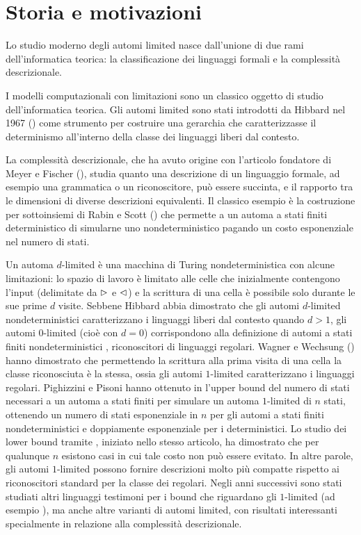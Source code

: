 \preface

\section*{Storia e motivazioni}
Lo studio moderno degli automi limited nasce dall'unione di due rami dell'informatica teorica: la classificazione dei linguaggi formali e la complessità descrizionale.

I modelli computazionali con limitazioni sono un classico oggetto di studio dell'informatica teorica. Gli automi limited sono stati introdotti da Hibbard nel 1967 (\cite{Hibbard:67:CFdet}) come strumento per costruire una gerarchia che caratterizzasse il determinismo all'interno della classe dei linguaggi liberi dal contesto.

La complessità descrizionale, che ha avuto origine con l'articolo fondatore di Meyer e Fischer (\cite{Meyer:71:ecodescription}), studia quanto una descrizione di un linguaggio formale, ad esempio una grammatica o un riconoscitore, può essere succinta, e il rapporto tra le dimensioni di diverse descrizioni equivalenti. Il classico esempio è la costruzione per sottoinsiemi di Rabin e Scott (\cite{Rabin:59:NFA}) che permette a un automa a stati finiti deterministico di simularne uno nondeterministico pagando un costo esponenziale nel numero di stati.

Un automa $d$-limited è una macchina di Turing nondeterministica con alcune limitazioni: lo spazio di lavoro è limitato alle celle che inizialmente contengono l'input (delimitate da $\rhd$ e $\lhd$) e la scrittura di una cella è possibile solo durante le sue prime $d$ visite. Sebbene Hibbard abbia dimostrato che gli automi $d$-limited nondeterministici caratterizzano i linguaggi liberi dal contesto quando $d>1$, gli automi $0$-limited (cioè con $d=0$) corrispondono alla definizione di automi a stati finiti nondeterministici , riconoscitori di linguaggi regolari. Wagner e Wechsung (\cite{Wagner:86:compCompl}) hanno dimostrato che permettendo la scrittura alla prima visita di una cella la classe riconosciuta è la stessa, ossia gli automi $1$-limited caratterizzano i linguaggi regolari. Pighizzini e Pisoni hanno ottenuto in \cite{Pighizzini:14:limitedRE} l'upper bound del numero di stati necessari a un automa a stati finiti per simulare un automa $1$-limited di $n$ stati, ottenendo un numero di stati esponenziale in $n$ per gli automi a stati finiti nondeterministici e doppiamente esponenziale per i deterministici. Lo studio dei lower bound tramite , iniziato nello stesso articolo, ha dimostrato che per qualunque $n$ esistono casi in cui tale costo non può essere evitato. In altre parole, gli automi $1$-limited possono fornire descrizioni molto più compatte rispetto ai riconoscitori standard per la classe dei regolari. Negli anni successivi sono stati studiati altri linguaggi testimoni per i bound che riguardano gli $1$-limited (ad esempio \cite{Pighizzini:22:limitedwitness}), ma anche altre varianti di automi limited, con risultati interessanti specialmente in relazione alla complessità descrizionale.

